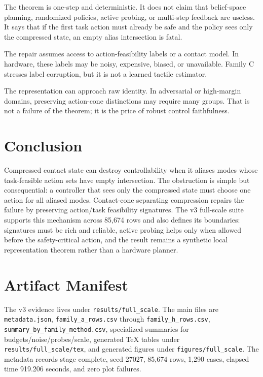 \documentclass{article}
\begin{document}
The theorem is one-step and deterministic. It does not claim that belief-space planning, randomized policies, active probing, or multi-step feedback are useless. It says that if the first task action must already be safe and the policy sees only the compressed state, an empty alias intersection is fatal.

The repair assumes access to action-feasibility labels or a contact model. In hardware, these labels may be noisy, expensive, biased, or unavailable. Family C stresses label corruption, but it is not a learned tactile estimator.

The representation can approach raw identity. In adversarial or high-margin domains, preserving action-cone distinctions may require many groups. That is not a failure of the theorem; it is the price of robust control faithfulness.

\section{Conclusion}
Compressed contact state can destroy controllability when it aliases modes whose task-feasible action sets have empty intersection. The obstruction is simple but consequential: a controller that sees only the compressed state must choose one action for all aliased modes. Contact-cone separating compression repairs the failure by preserving action/task feasibility signatures. The v3 full-scale suite supports this mechanism across 85,674 rows and also defines its boundaries: signatures must be rich and reliable, active probing helps only when allowed before the safety-critical action, and the result remains a synthetic local representation theorem rather than a hardware planner.




\appendix
\renewcommand{\thesection}{\arabic{section}}

\section{Artifact Manifest}
The v3 evidence lives under \texttt{results/full\_scale}. The main files are \texttt{metadata.json}, \texttt{family\_a\_rows.csv} through \texttt{family\_h\_rows.csv}, \texttt{summary\_by\_family\_method.csv}, specialized summaries for budgets/noise/probes/scale, generated TeX tables under \texttt{results/full\_scale/tex}, and generated figures under \texttt{figures/full\_scale}. The metadata records stage complete, seed 27027, 85,674 rows, 1,290 cases, elapsed time 919.206 seconds, and zero plot failures.
\end{document}
